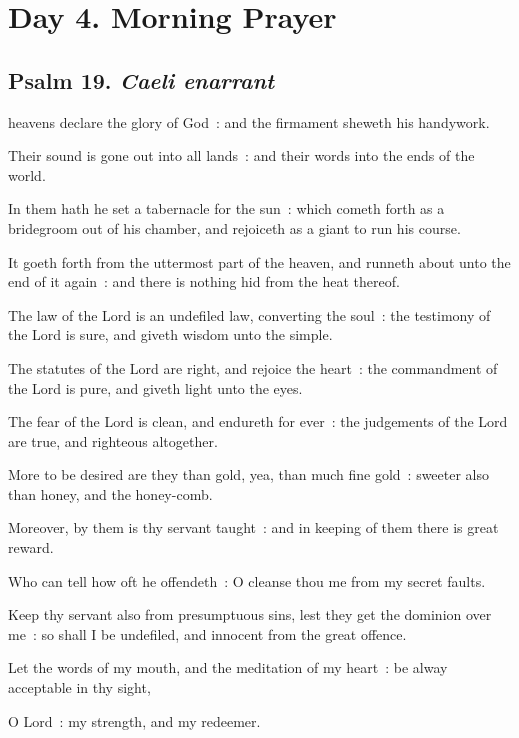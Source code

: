 \section*{Day 4. Morning Prayer}

\subsection{Psalm 19. \textit{Caeli enarrant}}

 heavens declare the glory of God~: and the firmament sheweth his handywork.\par
{}
Their sound is gone out into all lands~: and their words into the ends of the world.\par
{}In them hath he set a tabernacle for the sun~: which cometh forth as a bridegroom out of his chamber, and rejoiceth as a giant to run his course.\par
{}It goeth forth from the uttermost part of the heaven, and runneth about unto the end of it again~: and there is nothing hid from the heat thereof.\par
{}The law of the Lord is an undefiled law, converting the soul~: the testimony of the Lord is sure, and giveth wisdom unto the simple.\par
{}The statutes of the Lord are right, and rejoice the heart~: the commandment of the Lord is pure, and giveth light unto the eyes.\par
{}The fear of the Lord is clean, and endureth for ever~: the judgements of the Lord are true, and righteous altogether.\par
{}More to be desired are they than gold, yea, than much fine gold~: sweeter also than honey, and the honey-comb.\par
{}Moreover, by them is thy servant taught~: and in keeping of them there is great reward.\par
{}Who can tell how oft he offendeth~: O cleanse thou me from my secret faults.\par
{}Keep thy servant also from presumptuous sins, lest they get the dominion over me~: so shall I be undefiled, and innocent from the great offence.\par
{}Let the words of my mouth, and the meditation of my heart~: be alway acceptable in thy sight,\par
{}O Lord~: my strength, and my redeemer.\par

